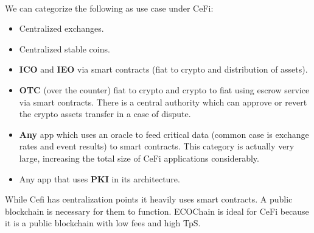 \documentclass{article}
\begin{document}
\paragraph{}
We can categorize the following as use case under CeFi:
\begin{itemize}
\item Centralized exchanges.
\item Centralized stable coins.
\item \textbf{ICO} and \textbf{IEO} via smart contracts (fiat to crypto and distribution of assets).
\item \textbf{OTC} (over the counter) fiat to crypto and crypto to fiat using escrow service via smart contracts. There is a central authority which can approve or revert the crypto assets transfer in a case of dispute.
\item \textbf{Any} app which uses an oracle to feed critical data (common case is exchange rates and event results) to smart contracts. This category is actually very large, increasing the total size of CeFi applications considerably.
\item Any app that uses \textbf{PKI} in its architecture.
\end{itemize}
While Cefi has centralization points it heavily uses smart contracts. A public blockchain is necessary for them to function. ECOChain is ideal for CeFi because it is a public blockchain with low fees and high TpS.
\end{document}
